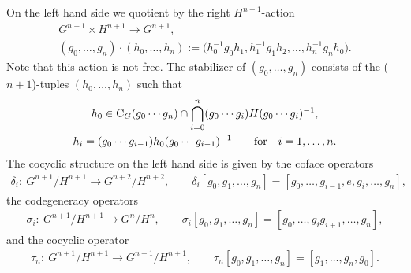 \documentclass[pdftex]{sigma}
\numberwithin{equation}{section}
\begin{document}
On the left hand side we quotient by the right $H^{n+1}$-action
\begin{gather*}%
G^{n+1}\times H^{n+1} \longrightarrow G^{n+1},
\\
(g_{0},\ldots, g_{n})\cdot (h_{0},\ldots, h_{n}) :=\big(h_{0}^{-1}g_{0}h_{1}, h_{1}^{-1}g_{1}h_{2},\ldots,
h_{n}^{-1}g_{n}h_{0}\big).
\end{gather*}
Note that this action is not free.
The stabilizer of $(g_{0},\ldots, g_{n})$ consists of the ($n+1$)-tuples $(h_{0},\ldots, h_{n})$ such that
\begin{gather}
h_{0}\in {\rm C}_{G}(g_{0}\cdots g_{n})\cap\bigcap_{i=0}^{n}(g_{0}\cdots g_{i})H (g_{0}\cdots g_{i})^{-1},
\nonumber\\
h_{i}=(g_{0}\cdots g_{i-1})h_{0} (g_{0}\cdots g_{i-1})^{-1}
\qquad
\text{for}
\quad
i=1,\ldots, n.\label{stab-LHS}
\end{gather}
The cocyclic structure on the left hand side is given by the coface operators
\begin{gather*}%
\delta_{i}\colon \  G^{n+1}/H^{n+1} \longrightarrow G^{n+2}/H^{n+2},
\qquad
\delta_{i}[g_{0}, g_{1},\ldots, g_{n}] =[g_{0}, \ldots, g_{i-1}, e, g_{i}, \ldots, g_{n}],
\end{gather*}
the codegeneracy operators
\begin{gather*}
\sigma_{i}\colon \  G^{n+1}/H^{n+1} \longrightarrow G^{n}/H^{n},
\qquad
\sigma_{i}[g_{0}, g_{1},\ldots, g_{n}] =[g_{0}, \ldots, g_{i}g_{i+1}, \ldots, g_{n}],
\end{gather*}
and the cocyclic operator
\begin{gather*}
\tau_{n}\colon \  G^{n+1}/H^{n+1} \longrightarrow G^{n+1}/H^{n+1},
\qquad
\tau_{n}[g_{0}, g_{1},\ldots, g_{n}] =[g_{1}, \ldots, g_{n}, g_{0}].
\end{gather*}
\end{document}
